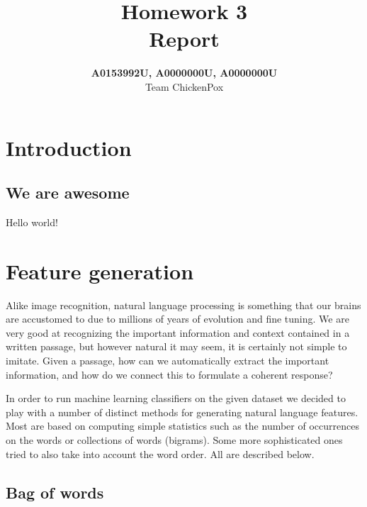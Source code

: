 \documentclass[a4paper]{article}
\title{Homework 3 \\ \large Report}
\author{\textbf{A0153992U, A0000000U, A0000000U} \\ Team ChickenPox}
\date{}
\numberwithin{equation}{section}
\begin{document}
\maketitle

\section{Introduction}

\subsection{We are awesome}

Hello world!

\section{Feature generation}

Alike image recognition, natural language processing is something that our brains are accustomed to due to millions of years of evolution and fine tuning. We are very good at recognizing the important information and context contained in a written passage, but however natural it may seem, it is certainly not simple to imitate. Given a passage, how can we automatically extract the important information, and how do we connect this to formulate a coherent response?

In order to run machine learning classifiers on the given dataset we decided to play with a number of distinct methods for generating natural language features. Most are based on computing simple statistics such as the number of occurrences on the words or collections of words (bigrams). Some more sophisticated ones tried to also take into account the word order. All are described below.

\subsection{Bag of words}
\end{document}
